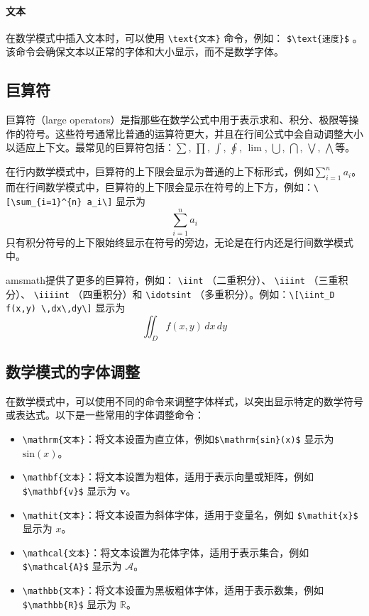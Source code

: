 \paragraph{文本} 在数学模式中插入文本时，可以使用 \verb|\text{文本}| 命令，例如： \verb|$\text{速度}$| 。该命令会确保文本以正常的字体和大小显示，而不是数学字体。

\subsection{巨算符}

巨算符（large operators）是指那些在数学公式中用于表示求和、积分、极限等操作的符号。这些符号通常比普通的运算符更大，并且在行间公式中会自动调整大小以适应上下文。最常见的巨算符包括：$\sum$, $\prod$, $\int$, $\oint$, $\lim$, $\bigcup$, $\bigcap$, $\bigvee$, $\bigwedge$等。

在行内数学模式中，巨算符的上下限会显示为普通的上下标形式，例如\(\sum_{i=1}^{n} a_i\)。而在行间数学模式中，巨算符的上下限会显示在符号的上下方，例如：\verb|\[\sum_{i=1}^{n} a_i\]| 显示为
\[\sum_{i=1}^{n} a_i \]只有积分符号的上下限始终显示在符号的旁边，无论是在行内还是行间数学模式中。

amsmath提供了更多的巨算符，例如： \verb|\iint| （二重积分）、 \verb|\iiint| （三重积分）、 \verb|\iiiint| （四重积分）和 \verb|\idotsint| （多重积分）。例如：\verb|\[\iint_D f(x,y) \,dx\,dy\]| 显示为
\[\iint_D f(x,y) \,dx\,dy\]

\subsection{数学模式的字体调整}
在数学模式中，可以使用不同的命令来调整字体样式，以突出显示特定的数学符号或表达式。以下是一些常用的字体调整命令：
\begin{itemize}
  \item \verb|\mathrm{文本}|：将文本设置为直立体，例如\verb|$\mathrm{sin}(x)$| 显示为 \(\mathrm{sin}(x)\)。
  \item \verb|\mathbf{文本}|：将文本设置为粗体，适用于表示向量或矩阵，例如\verb|$\mathbf{v}$| 显示为 \(\mathbf{v}\)。
  \item \verb|\mathit{文本}|：将文本设置为斜体字体，适用于变量名，例如 \verb|$\mathit{x}$| 显示为 \(\mathit{x}\)。
  \item \verb|\mathcal{文本}|：将文本设置为花体字体，适用于表示集合，例如\verb|$\mathcal{A}$| 显示为 \(\mathcal{A}\)。
  \item \verb|\mathbb{文本}|：将文本设置为黑板粗体字体，适用于表示数集，例如\verb|$\mathbb{R}$| 显示为 \(\mathbb{R}\)。
\end{itemize}

